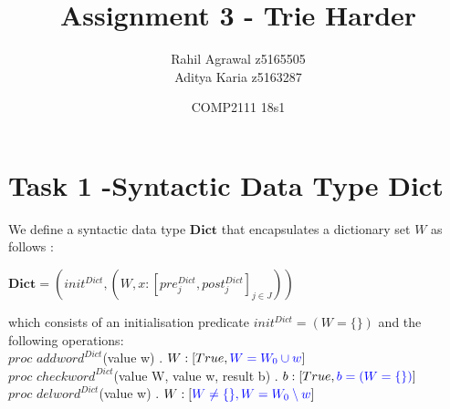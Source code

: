 \documentclass[a4paper,12pt,fleqn]{scrartcl}
\title{Assignment 3 - Trie Harder}
\date{COMP2111 18s1}
\author{Rahil Agrawal z5165505\\Aditya Karia z5163287}
\newcommand{\Dict}{\mathbf{Dict}}
\begin{document}
\maketitle
{}

\section{Task 1 -Syntactic Data Type Dict}
\label{sec:task-1}
We define a syntactic data type $\Dict$ that encapsulates a dictionary set $W$ as follows :
\begin{center}$\Dict = (init^{Dict} , (W,x : [pre_{j}^{Dict}, post_{j}^{Dict}]_{j\in J}))$\end{center}
which consists of an  initialisation predicate \color{blue}$init^{Dict} = (W = \{ \})$ \color{black} and the following operations:\\
$proc$ $addword^{Dict}$(value w) . $W : [True, \color{blue}W = W_{0} \cup w\color{black}]$\\
$proc$ $checkword^{Dict}$(value W, value w, result b) . $b : [True, \color{blue}b = (W = \{ \})\color{black}]$\\
$proc$ $delword^{Dict}$(value w) . $W : [\color{blue}W\neq \{ \}, W = W_{0} \setminus {w}\color{black}]$\\
\end{document}
